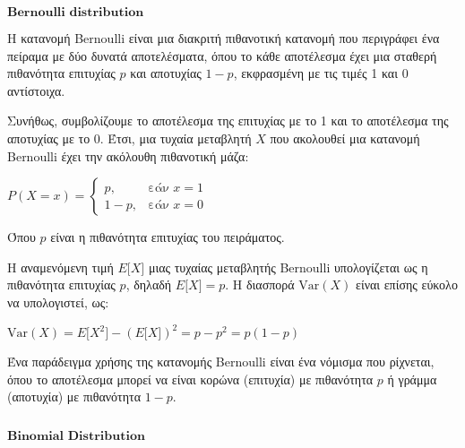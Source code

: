\documentclass[11pt]{article}
\makeatletter
\newcommand{\boxspacing}{\kern\kvtcb@left@rule\kern\kvtcb@boxsep}
\newcommand{\prompt}[4]{
        {\ttfamily\llap{{\color{#2}[#3]:\hspace{3pt}#4}}\vspace{-\baselineskip}}
    }
\makeatother
\begin{document}
    \begin{tcolorbox}[breakable, size=fbox, boxrule=1pt, pad at break*=1mm,colback=cellbackground, colframe=cellborder]
\prompt{In}{incolor}{ }{\boxspacing}
\begin{Verbatim}[commandchars=\\\{\}]

\end{Verbatim}
\end{tcolorbox}

    \(\textbf{Bernoulli distribution}\)

    Η κατανομή Bernoulli είναι μια διακριτή πιθανοτική κατανομή που
περιγράφει ένα πείραμα με δύο δυνατά αποτελέσματα, όπου το κάθε
αποτέλεσμα έχει μια σταθερή πιθανότητα επιτυχίας $ p $ και αποτυχίας
$ 1-p $, εκφρασμένη με τις τιμές 1 και 0 αντίστοιχα.

Συνήθως, συμβολίζουμε το αποτέλεσμα της επιτυχίας με το 1 και το
αποτέλεσμα της αποτυχίας με το 0. Έτσι, μια τυχαία μεταβλητή $ X $ που
ακολουθεί μια κατανομή Bernoulli έχει την ακόλουθη πιθανοτική μάζα:

$ P(X = x) =\begin{cases} p, & \text{εάν } x = 1 \\ 1-p, & \text{εάν } x = 0 \end{cases}$

Όπου $ p $ είναι η πιθανότητα επιτυχίας του πειράματος.

Η αναμενόμενη τιμή $ E{[}X{]} $ μιας τυχαίας μεταβλητής Bernoulli
υπολογίζεται ως η πιθανότητα επιτυχίας $ p $, δηλαδή $ E{[}X{]} = p
$. Η διασπορά $ \text{Var}(X) $ είναι επίσης εύκολο να υπολογιστεί,
ως:

$ \text{Var}(X) = E{[}X^2{]} - (E{[}X{]})^2 = p - p^2 = p(1-p)$

Ένα παράδειγμα χρήσης της κατανομής Bernoulli είναι ένα νόμισμα που
ρίχνεται, όπου το αποτέλεσμα μπορεί να είναι κορώνα (επιτυχία) με
πιθανότητα $ p $ ή γράμμα (αποτυχία) με πιθανότητα $ 1-p $.

    \begin{tcolorbox}[breakable, size=fbox, boxrule=1pt, pad at break*=1mm,colback=cellbackground, colframe=cellborder]
\prompt{In}{incolor}{ }{\boxspacing}
\begin{Verbatim}[commandchars=\\\{\}]

\end{Verbatim}
\end{tcolorbox}

    \(\textbf{Binomial Distribution}\)
\end{document}

